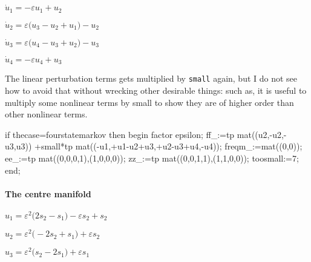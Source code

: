 \documentclass[11pt,a5paper]{article}
\begin{document}
\begin{math}
\dot u_{1}=-\varepsilon  u_{1}+u_{2}
\end{math}\par

\begin{math}
\dot u_{2}=\varepsilon  \big(u_{3}-u_{2}+u_{1}\big)-u_{2}
\end{math}\par

\begin{math}
\dot u_{3}=\varepsilon  \big(u_{4}-u_{3}+u_{2}\big)-u_{3}
\end{math}\par

\begin{math}
\dot u_{4}=-\varepsilon  u_{4}+u_{3}
\end{math}\par

The linear perturbation terms gets multiplied by \verb|small| again, but I do not see how to avoid that without wrecking other desirable things: such as, it is useful to multiply some nonlinear terms by small to show they are of higher order than other nonlinear terms. 

\begin{reduce}
if thecase=fourstatemarkov then begin
factor epsilon;
ff_:=tp mat((u2,-u2,-u3,u3))
+small*tp mat((-u1,+u1-u2+u3,+u2-u3+u4,-u4));
freqm_:=mat((0,0));
ee_:=tp mat((0,0,0,1),(1,0,0,0));
zz_:=tp mat((0,0,1,1),(1,1,0,0));
toosmall:=7; 
end;
\end{reduce}


\paragraph{The centre manifold}

\begin{math}
u_{1}=\varepsilon ^{2} \big(2 s_{2}-s_{1}\big)-
\varepsilon  s_{2}+s_{2}
\end{math}\par

\begin{math}
u_{2}=\varepsilon ^{2} \big(-2 s_{2}+s_{1}\big)+
\varepsilon  s_{2}
\end{math}\par

\begin{math}
u_{3}=\varepsilon ^{2} \big(s_{2}-2 s_{1}\big)+
\varepsilon  s_{1}
\end{math}\par
\end{document}
